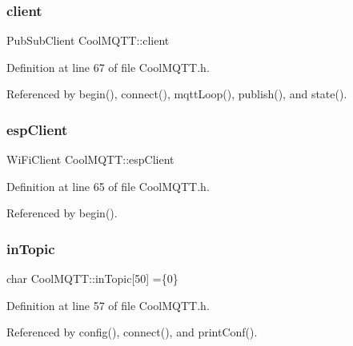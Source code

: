 \subsubsection{\texorpdfstring{client}{client}}
{\footnotesize\ttfamily Pub\+Sub\+Client Cool\+M\+Q\+T\+T\+::client\hspace{0.3cm}{\ttfamily [private]}}



Definition at line 67 of file Cool\+M\+Q\+T\+T.\+h.



Referenced by begin(), connect(), mqtt\+Loop(), publish(), and state().

\mbox{\label{classCoolMQTT_acc30a0200967374a524092a8a806502a}} 
\subsubsection{\texorpdfstring{esp\+Client}{espClient}}
{\footnotesize\ttfamily Wi\+Fi\+Client Cool\+M\+Q\+T\+T\+::esp\+Client\hspace{0.3cm}{\ttfamily [private]}}



Definition at line 65 of file Cool\+M\+Q\+T\+T.\+h.



Referenced by begin().

\mbox{\label{classCoolMQTT_a4492f52a441e83cc5151010317fdb52d}} 
\subsubsection{\texorpdfstring{in\+Topic}{inTopic}}
{\footnotesize\ttfamily char Cool\+M\+Q\+T\+T\+::in\+Topic\mbox{[}50\mbox{]} =\{\textquotesingle{}0\textquotesingle{}\}\hspace{0.3cm}{\ttfamily [private]}}



Definition at line 57 of file Cool\+M\+Q\+T\+T.\+h.



Referenced by config(), connect(), and print\+Conf().

\mbox{\label{classCoolMQTT_ab8bb951f87ddbf92db74c2ad16a3e53e}} 
